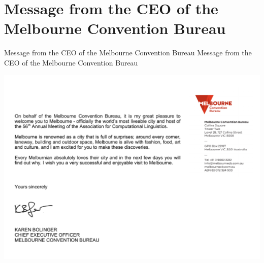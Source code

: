 \section{Message from the CEO of the Melbourne Convention Bureau}
\setheaders%
    {Message from the CEO of the Melbourne Convention Bureau}%
    {Message from the CEO of the Melbourne Convention Bureau}
\thispagestyle{emptyheader}

%
\includegraphics[width=\textwidth]{content/welcome/welcome_letter_shifted.pdf}
